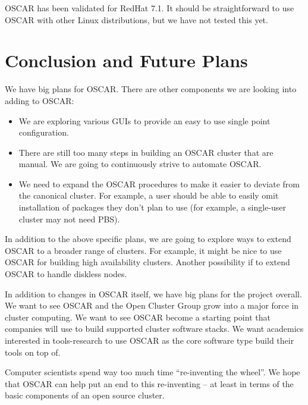 \documentclass[letterpaper,11pt]{article}
\begin{document}
OSCAR has been validated for RedHat 7.1.  It should be straightforward
to use OSCAR with other Linux distributions, but we have not tested
this yet.

\section{Conclusion and Future Plans}
We have big plans for OSCAR.  There are other components we are
looking into adding to OSCAR:
\begin{itemize}
        \item We are exploring various GUIs to provide an easy to use
        single point configuration.

        \item There are still too many steps in building an OSCAR cluster
        that are manual.  We are going to continuously strive to automate
        OSCAR.

        \item We need to expand the OSCAR procedures to make it easier to
        deviate from the canonical cluster.  For example, a user should be
        able to easily omit installation of packages they don't plan to
        use (for example, a single-user cluster may not need PBS).
\end{itemize}

In addition to the above specific plans, we are going to explore ways
to extend OSCAR to a broader range of clusters.  For example, it might
be nice to use OSCAR for building high availability clusters.  Another
possibility if to extend OSCAR to handle diskless nodes.

In addition to changes in OSCAR itself, we have big plans for the
project overall.  We want to see OSCAR and the Open Cluster Group grow
into a major force in cluster computing.  We want to see OSCAR become
a starting point that companies will use to build supported cluster
software stacks.  We want academics interested in tools-research to
use OSCAR as the core software type build their tools on top of.

Computer scientists spend way too much time ``re-inventing the
wheel''.  We hope that OSCAR can help put an end to this re-inventing
-- at least in terms of the basic components of an open source
cluster.
\end{document}
